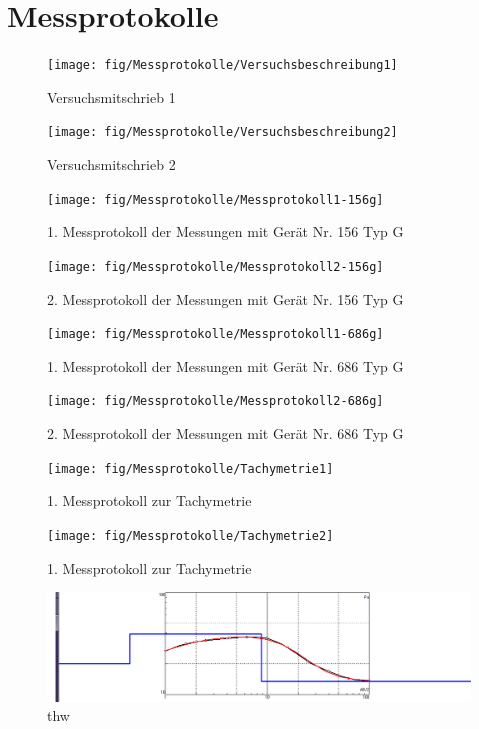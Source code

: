 \section{Messprotokolle}

\begin{figure}[!ht]
 \centering
 \texttt{[image: fig/Messprotokolle/Versuchsbeschreibung1]}
 \caption{Versuchsmitschrieb 1}
 \label{fig:mitschrieb1}
\end{figure}

\begin{figure}[!ht]
 \centering
 \texttt{[image: fig/Messprotokolle/Versuchsbeschreibung2]}
 \caption{Versuchsmitschrieb 2}
 \label{fig:mitschrieb2}
\end{figure}

\begin{figure}[!ht]
 \centering
 \texttt{[image: fig/Messprotokolle/Messprotokoll1-156g]}
 \caption{1. Messprotokoll der Messungen mit Gerät Nr. 156 Typ G}
 \label{fig:MP1_156}
\end{figure}

\begin{figure}[!ht]
 \centering
 \texttt{[image: fig/Messprotokolle/Messprotokoll2-156g]}
 \caption{2. Messprotokoll der Messungen mit Gerät Nr. 156 Typ G}
 \label{fig:MP2_156}
\end{figure}

\begin{figure}[!ht]
 \centering
 \texttt{[image: fig/Messprotokolle/Messprotokoll1-686g]}
 \caption{1. Messprotokoll der Messungen mit Gerät Nr. 686 Typ G}
 \label{fig:MP1_686}
\end{figure}

\begin{figure}[!ht]
 \centering
 \texttt{[image: fig/Messprotokolle/Messprotokoll2-686g]}
 \caption{2. Messprotokoll der Messungen mit Gerät Nr. 686 Typ G}
 \label{fig:MP2_686}
\end{figure}

\begin{figure}[!ht]
 \centering
 \texttt{[image: fig/Messprotokolle/Tachymetrie1]}
 \caption{1. Messprotokoll zur Tachymetrie}
 \label{fig:MPTachymetrie1}
\end{figure}

\begin{figure}[!ht]
 \centering
 \texttt{[image: fig/Messprotokolle/Tachymetrie2]}
 \caption{1. Messprotokoll zur Tachymetrie}
 \label{fig:MPTachymetrie2}
\end{figure}

\begin{figure}[!ht]
 \centering
 \includegraphics[width=\textwidth]{fig/Messprotokolle/schlumberger_sondierung.bmp}
 \caption{thw}
 \label{fig:}
\end{figure}

